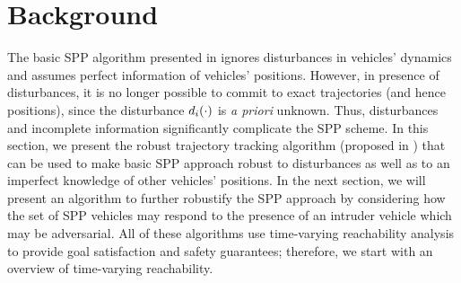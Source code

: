 \section{Background \label{sec:background}}
The basic SPP algorithm presented in \cite{Chen15c} ignores disturbances in vehicles' dynamics and assumes perfect information of vehicles' positions. However, in presence of disturbances, it is no longer possible to commit to exact trajectories (and hence positions), since the disturbance $d_i(\cdot)$ is \textit{a priori} unknown. Thus, disturbances and incomplete information significantly complicate the SPP scheme. In this section, we present the robust trajectory tracking algorithm (proposed in \cite{Bansal2017}) that can be used to make basic SPP approach robust to disturbances as well as to an imperfect knowledge of other vehicles' positions. In the next section, we will present an algorithm to further robustify the SPP approach by considering how the set of SPP vehicles may respond to the presence of an intruder vehicle which may be adversarial. All of these algorithms use time-varying reachability analysis to provide goal satisfaction and safety guarantees; therefore, we start with an overview of time-varying reachability.
%

